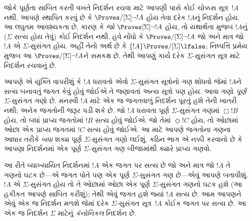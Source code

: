 જોકે પૂર્ણતા સાબિત કરતી વખતે નિદર્શન રચવા માટે આપણી પાસે કોઈ
ચોક્કસ સૂત્ર~$!A$ નથી. આપણે સ્થાપિત કરવું છે કે
$\Proves/[\Sigma] \lnot !A$ હોય તેવા દરેક $!A$નું નિદર્શન હોય.
આ લઘુતમ આવશ્યકતા છે, કારણ કે \emph{જો} $\Proves[\Sigma] \lnot !A$
હોય, તો યથાર્થતા મુજબ $!A$નું ($\Sigma$ સત્ય હોય તેવું) કોઈ
નિદર્શન નથી. હવે નોંધો કે $\Proves/[\Sigma] \lnot !A$ જો અને માત્ર
જો $!A$ એ $\Sigma$-સુસંગત હોય. અહીં તેનો અર્થ છે કે
$\{!A\} \Proves/[\Sigma] \lfalse$; નિષ્પત્તિ પ્રમેય મુજબ આ
$\Proves/[\Sigma] \lnot !A$ને સમકક્ષ છે. તેથી આપણું કાર્ય દરેક $\Sigma$-સુસંગત સૂત્ર
માટે નિદર્શન રચવાનું છે.


આપણે એ યુક્તિ વાપરીશું કે $!A$ ધરાવતો એવો $\Sigma$-સુસંગત
સૂત્રોનો ગણ શોધવો જેમાં $!A$ને સત્ય બનાવતું જગત કેવું હોવું
જોઈએ તે જણાવતાં અન્ય સૂત્રો પણ હોય. આવા ગણો \emph{પૂર્ણ}
$\Sigma$-સુસંગત ગણો છે. મનસ્વી $!A$ માટે એક જ જગતવાળું નિદર્શન
પૂરતું હશે તેની ખાતરી નથી; અનેક જગતોની જરૂર પડી શકે છે.
જો $!A$ ધરાવતા પૂર્ણ $\Sigma$-સુસંગત ગણમાં $\Box !B$ હોય,
તો બધાં પ્રાપ્ય જગતોમાં $!B$ સત્ય હોવું જોઈએ. જો તેમાં
$\Diamond !C$ હોય, તો ઓછામાં ઓછા એક પ્રાપ્ય જગતમાં $!C$ સત્ય
હોવું જોઈએ. આ માટે આપણે જગતોના ગણના આધાર તરીકે \emph{બધા}
શક્ય પૂર્ણ $\Sigma$-સુસંગત ગણો લઈશું. કઠિન ભાગ એ નક્કી કરવાનો
છે કે આપણા નિદર્શનમાં એક પૂર્ણ $\Sigma$-સુસંગત ગણ બીજામાંથી
ક્યારે પ્રાપ્ય ગણવો.


આ રીતે વ્યાખ્યાયિત નિદર્શનમાં $!A$ એક જગત પર સત્ય છે જો અને માત્ર
જો $!A$ તે ગણનો ઘટક છે—એ જગત પોતે પણ એક પૂર્ણ
$\Sigma$-સુસંગત ગણ છે—એવું આપણે બતાવીશું. $!A$ એ
$\Sigma$-સુસંગત હોય તો તે ઓછામાં ઓછા એક પૂર્ણ $\Sigma$-સુસંગત
ગણનો ઘટક હશે (આ હકીકત આપણે સાબિત કરીશું); તેથી એવું
જગત હશે જ્યાં $!A$ સત્ય છે. આમ આપણને એવું એક જ નિદર્શન મળશે જેમાં
દરેક $\Sigma$-સુસંગત સૂત્ર~$!A$ કોઈક જગત પર સત્ય છે.
આ એક જ નિદર્શન $\Sigma$ માટેનું \emph{કૅનોનિકલ} નિદર્શન છે.
\endgroup

\begingroup
\makeatletter{}\makeatother


